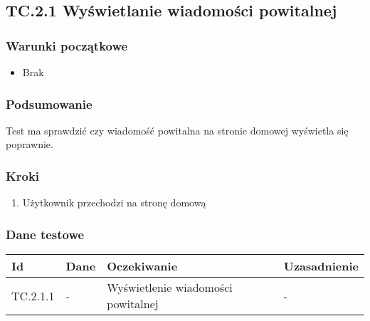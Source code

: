\documentclass[a4paper,15pt]{article}
\begin{document}
\begin{framed}
\subsection{TC.2.1 Wyświetlanie wiadomości powitalnej}


\vspace{0.5cm}

\subsubsection{Warunki początkowe}
\begin{itemize}
\item Brak
\end{itemize}

\subsubsection{Podsumowanie}
Test ma sprawdzić czy wiadomość powitalna na stronie domowej wyświetla się poprawnie.

\subsubsection{Kroki}
\begin{enumerate}
\item Użytkownik przechodzi na stronę domową
\end{enumerate}

\subsubsection{Dane testowe}

\begin{center}
\begin{tabular}{ |C{1.5cm}|C{3cm}|C{4cm}|C{4cm}| } 
 \hline
 \textbf{Id} & \textbf{Dane} & \textbf{Oczekiwanie} & \textbf{Uzasadnienie} \\ \hline
 TC.2.1.1 & - & Wyświetlenie wiadomości powitalnej & - \\ \hline
\end{tabular}
\end{center}

\end{framed}
\end{document}
